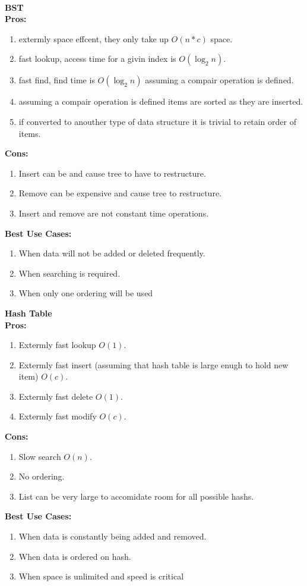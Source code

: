 \documentclass[11pt]{article}
\begin{document}
	\\
	{\bf BST}\\
	{\bf Pros:}
	\begin{enumerate}
		\item extermly space effcent, they only take up $O(n*c)$ space.
		\item fast lookup, access time for a givin index is $O(\log_{2} n)$.
		\item fast find, find time is $O(\log_{2} n)$ assuming a compair operation is defined.
		\item assuming a compair operation is defined items are sorted as they are inserted.
		\item if converted to anouther type of data structure it is trivial to retain order of items.
	\end{enumerate}
	{\bf Cons:}
	\begin{enumerate}
		\item Insert can be and cause tree to have to restructure.
		\item Remove can be expensive and cause tree to restructure.
		\item Insert and remove are not constant time operations.
	\end{enumerate}
	{\bf Best Use Cases:}
	\begin{enumerate}
		\item When data will not be added or deleted frequently.
		\item When searching is required.
		\item When only one ordering will be used
	\end{enumerate}
	{\bf Hash Table}\\
	{\bf Pros:}
	\begin{enumerate}
		\item Extermly fast lookup $O(1)$.
		\item Extermly fast insert (assuming that hash table is large enugh to hold new item) $O(c)$.
		\item Extermly fast delete $O(1)$.
		\item Extermly fast modify $O(c)$.
	\end{enumerate}
	{\bf Cons:}
	\begin{enumerate}
		\item Slow search $O(n)$.
		\item No ordering.
		\item List can be very large to accomidate room for all possible hashs.
	\end{enumerate}
	{\bf Best Use Cases:}
	\begin{enumerate}
		\item When data is constantly being added and removed.
		\item When data is ordered on hash.
		\item When space is unlimited and speed is critical
	\end{enumerate}
	
\end{document}

